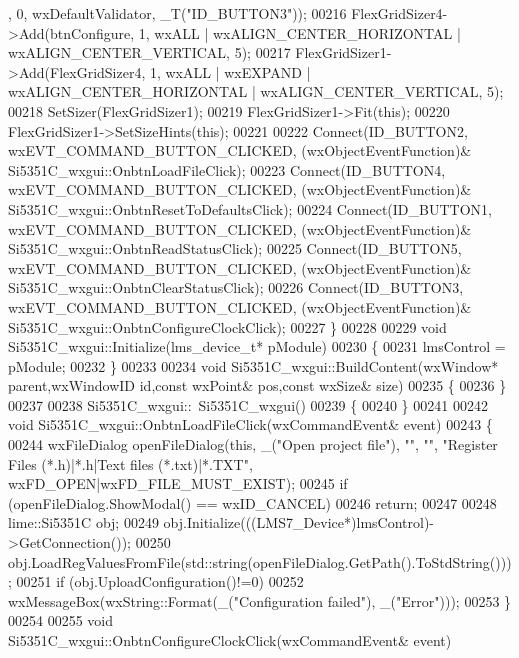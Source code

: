 \begin{DoxyCode}
      , 0, wxDefaultValidator, _T(\textcolor{stringliteral}{"ID\_BUTTON3"}));
00216     FlexGridSizer4->Add(btnConfigure, 1, wxALL | wxALIGN\_CENTER\_HORIZONTAL | wxALIGN\_CENTER\_VERTICAL, 5);
00217     FlexGridSizer1->Add(FlexGridSizer4, 1, wxALL | wxEXPAND | wxALIGN\_CENTER\_HORIZONTAL | 
      wxALIGN\_CENTER\_VERTICAL, 5);
00218     SetSizer(FlexGridSizer1);
00219     FlexGridSizer1->Fit(\textcolor{keyword}{this});
00220     FlexGridSizer1->SetSizeHints(\textcolor{keyword}{this});
00221 
00222     Connect(ID\_BUTTON2, wxEVT\_COMMAND\_BUTTON\_CLICKED, (wxObjectEventFunction)&
      Si5351C_wxgui::OnbtnLoadFileClick);
00223     Connect(ID\_BUTTON4, wxEVT\_COMMAND\_BUTTON\_CLICKED, (wxObjectEventFunction)&
      Si5351C_wxgui::OnbtnResetToDefaultsClick);
00224     Connect(ID\_BUTTON1, wxEVT\_COMMAND\_BUTTON\_CLICKED, (wxObjectEventFunction)&
      Si5351C_wxgui::OnbtnReadStatusClick);
00225     Connect(ID\_BUTTON5, wxEVT\_COMMAND\_BUTTON\_CLICKED, (wxObjectEventFunction)&
      Si5351C_wxgui::OnbtnClearStatusClick);
00226     Connect(ID\_BUTTON3, wxEVT\_COMMAND\_BUTTON\_CLICKED, (wxObjectEventFunction)&
      Si5351C_wxgui::OnbtnConfigureClockClick);
00227 \}
00228 
00229 \textcolor{keywordtype}{void} Si5351C_wxgui::Initialize(lms_device_t* pModule)
00230 \{
00231     lmsControl = pModule;
00232 \}
00233 
00234 \textcolor{keywordtype}{void} Si5351C_wxgui::BuildContent(wxWindow* parent,wxWindowID \textcolor{keywordtype}{id},\textcolor{keyword}{const} wxPoint& pos,\textcolor{keyword}{const} wxSize& 
      size)
00235 \{
00236 \}
00237 
00238 Si5351C_wxgui::~Si5351C_wxgui()
00239 \{
00240 \}
00241 
00242 \textcolor{keywordtype}{void} Si5351C_wxgui::OnbtnLoadFileClick(wxCommandEvent& event)
00243 \{
00244    wxFileDialog openFileDialog(\textcolor{keyword}{this}, \_(\textcolor{stringliteral}{"Open project file"}), \textcolor{stringliteral}{""}, \textcolor{stringliteral}{""}, \textcolor{stringliteral}{"Register Files (*.h)|*.h|Text files
       (*.txt)|*.TXT"}, wxFD\_OPEN|wxFD\_FILE\_MUST\_EXIST);
00245     \textcolor{keywordflow}{if} (openFileDialog.ShowModal() == wxID\_CANCEL)
00246         \textcolor{keywordflow}{return};
00247 
00248     lime::Si5351C obj;
00249     obj.Initialize(((LMS7_Device*)lmsControl)->GetConnection());
00250     obj.LoadRegValuesFromFile(std::string(openFileDialog.GetPath().ToStdString()));
00251     \textcolor{keywordflow}{if} (obj.UploadConfiguration()!=0)
00252         wxMessageBox(wxString::Format(\_(\textcolor{stringliteral}{"Configuration failed"}), \_(\textcolor{stringliteral}{"Error"})));
00253 \}
00254 
00255 \textcolor{keywordtype}{void} Si5351C_wxgui::OnbtnConfigureClockClick(wxCommandEvent& event)

\end{DoxyCode}
